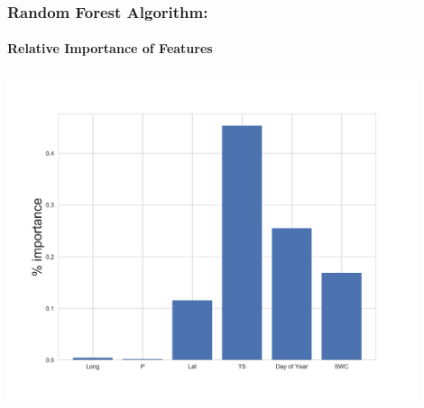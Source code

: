 \documentclass{beamer}
\begin{document}
\begin{frame}
\frametitle{Random Forest Algorithm:}
\framesubtitle{Relative Importance of Features}
\centering
\includegraphics[width=0.9\textwidth]{importance.png}\\
\end{frame}
\end{document}
